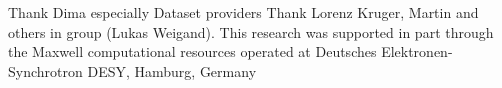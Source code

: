 Thank Dima especially
Dataset providers
Thank Lorenz Kruger, Martin and others in group (Lukas Weigand).
This research was supported in part through the Maxwell computational resources operated at Deutsches Elektronen-Synchrotron DESY, Hamburg, Germany

